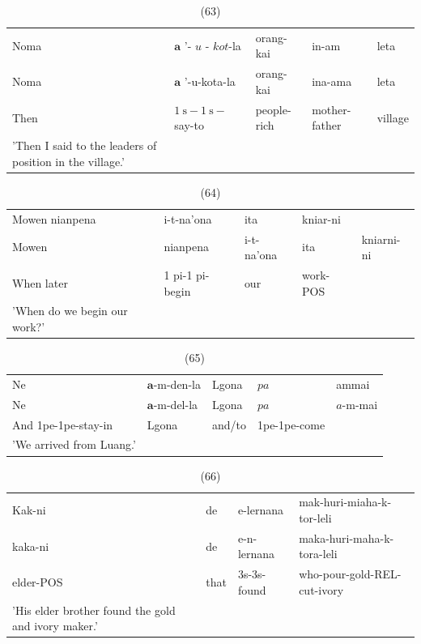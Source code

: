 \documentclass[10pt]{article}
\begin{document}
\begin{table}[h]
\begin{center}
\captionsetup{labelformat=empty}
\caption{(63)}
\begin{tabular}{lllll}
Noma & \(\boldsymbol{a}\) '- \(u\) - \(k o t\)-la & orang-kai & in-am & leta \\
Noma & \(\boldsymbol{a}\) '-u-kota-la & orang-kai & ina-ama & leta \\
Then & \(1 \mathrm{~s}-1 \mathrm{~s}-\) say-to & people-rich & mother-father & village \\
'Then I said to the leaders of position in the village.' &  &  &  &  \\
\end{tabular}
\end{center}
\end{table}

\begin{table}[h]
\begin{center}
\captionsetup{labelformat=empty}
\caption{(64)}
\begin{tabular}{lllll}
Mowen nianpena & i-t-na'ona & ita & kniar-ni &  \\
Mowen & nianpena & i-t-na'ona & ita & kniarni-ni \\
When later & 1 pi-1 pi-begin & our & work-POS &  \\
'When do we begin our work?' &  &  &  &  \\
\end{tabular}
\end{center}
\end{table}

\begin{table}[h]
\begin{center}
\captionsetup{labelformat=empty}
\caption{(65)}
\begin{tabular}{lllll}
Ne & \(\boldsymbol{a}\)-m-den-la & Lgona & \(p a\) & ammai \\
Ne & \(\boldsymbol{a}\)-m-del-la & Lgona & \(p a\) & \(a\)-m-mai \\
And 1pe-1pe-stay-in & Lgona & and/to & 1pe-1pe-come &  \\
'We arrived from Luang.' &  &  &  &  \\
\end{tabular}
\end{center}
\end{table}

\begin{table}[h]
\begin{center}
\captionsetup{labelformat=empty}
\caption{(66)}
\begin{tabular}{llll}
Kak-ni & de & e-lernana & mak-huri-miaha-k-tor-leli \\
kaka-ni & de & e-n-lernana & maka-huri-maha-k-tora-leli \\
elder-POS & that & 3s-3s-found & who-pour-gold-REL-cut-ivory \\
'His elder brother found the gold and ivory maker.' &  &  &  \\
\end{tabular}
\end{center}
\end{table}
\end{document}
